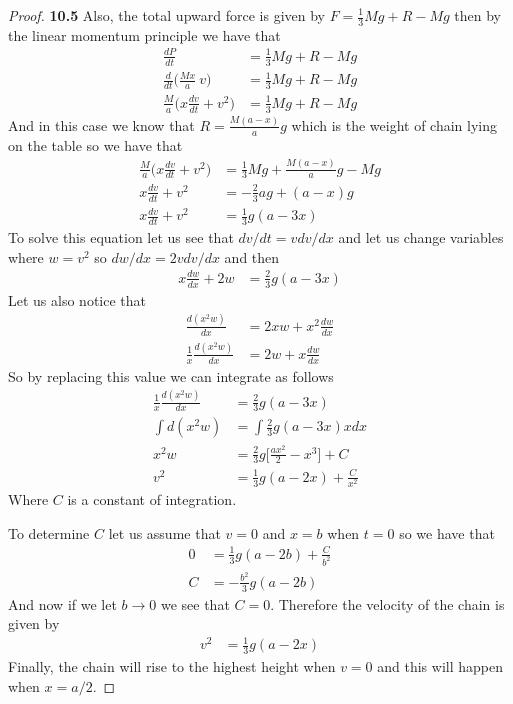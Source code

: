\documentclass[11pt]{article}
\theoremstyle{definition}
\begin{document}
\begin{proof}{\textbf{10.5}}
        Also, the total upward force is given by
        $F=\frac{1}{3}Mg + R - Mg$ then by the linear momentum principle we
        have that
        \begin{align*}
            \frac{dP}{dt} &= \frac{1}{3}Mg + R - Mg\\
            \frac{d}{dt}\bigg(\frac{Mx}{a}~v\bigg) &= \frac{1}{3}Mg + R - Mg\\
            \frac{M}{a}\bigg(x\frac{dv}{dt} + v^2\bigg) &= \frac{1}{3}Mg + R - Mg            
        \end{align*}
        And in this case we know that $R = \frac{M(a-x)}{a}g$ which is the
        weight of chain lying on the table so we have that
        \begin{align*}
            \frac{M}{a}\bigg(x\frac{dv}{dt} + v^2\bigg)
            &= \frac{1}{3}Mg + \frac{M(a-x)}{a}g - Mg\\
            x\frac{dv}{dt} + v^2
            &= -\frac{2}{3}ag + (a-x)g\\
            x\frac{dv}{dt} + v^2
            &= \frac{1}{3}g(a -3x)
        \end{align*}
        To solve this equation let us see that $dv/dt = vdv/dx$
        and let us change variables where $w = v^2$ so $dw/dx = 2vdv/dx$
        and then
        \begin{align*}
            x\frac{dw}{dx} + 2w
            &= \frac{2}{3}g(a -3x)
        \end{align*}
        Let us also notice that
        \begin{align*}
            \frac{d(x^2w)}{dx} &= 2xw + x^2\frac{dw}{dx}\\
            \frac{1}{x}\frac{d(x^2w)}{dx} &= 2w + x\frac{dw}{dx}
        \end{align*}
        So by replacing this value we can integrate as follows
        \begin{align*}
            \frac{1}{x}\frac{d(x^2w)}{dx} &= \frac{2}{3}g(a -3x)\\
            \int d(x^2w) &= \int \frac{2}{3}g(a -3x)x dx\\
            x^2w &= \frac{2}{3}g\bigg[\frac{ax^2}{2} - x^3\bigg] + C\\
            v^2 &= \frac{1}{3}g(a - 2x) + \frac{C}{x^2}
        \end{align*}
        Where $C$ is a constant of integration.

        To determine $C$ let us assume that $v=0$ and $x=b$ when $t=0$ so we
        have that
        \begin{align*}
        0 &= \frac{1}{3}g(a - 2b) + \frac{C}{b^2}\\
        C &= -\frac{b^2}{3}g(a - 2b)
        \end{align*}
        And now if we let $b \to 0$ we see that $C = 0$. Therefore the velocity
        of the chain is given by
        \begin{align*}
            v^2 &= \frac{1}{3}g(a - 2x)
        \end{align*}
        Finally, the chain will rise to the highest height when $v=0$ and this
        will happen when $x=a/2$.   
    \end{proof}
\end{document}

